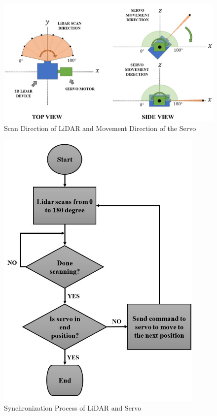 
\begin{figure}[H]
	\centering
	\includegraphics[width=1\textwidth]{Figures/scan_direction_of_lidar_and_servo}
	\caption{Scan Direction of LiDAR and Movement Direction of the Servo}
	\label{ch3:fig:servo_lidar_comm}
\end{figure}

\begin{figure}[H]
	\centering
	\includegraphics[width=0.9\textwidth, height=0.9\textwidth]{Figures/lidar_servo_sync}
	\caption{Synchronization Process of LiDAR and Servo}
	\label{ch3:fig:scan_and_movement_direction}
\end{figure}

